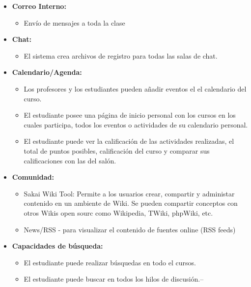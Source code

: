 	\begin{itemize}
		\item \textbf{Correo Interno:}
			\begin{itemize}
				\item Envío de mensajes a toda la clase
			\end{itemize}
	\end{itemize}
	\begin{itemize}
		\item \textbf{Chat:}	
			\begin{itemize}
				\item El sistema crea archivos de registro para todas las salas de chat.
			\end{itemize}
	\end{itemize}
	\begin{itemize}
		\item \textbf{Calendario/Agenda:}
			\begin{itemize}
				\item Los profesores y los estudiantes pueden añadir eventos el el calendario del curso.
				\item El estudiante posee una página de inicio personal con los cursos en los cuales participa, todos los eventos o actividades de su calendario personal.
				\item El estudiante puede ver la calificación de las actividades realizadas, el total de puntos posibles, calificación del curso y comparar sus calificaciones con las del salón.
			\end{itemize}
	\end{itemize}
	\begin{itemize}
		\item \textbf{Comunidad:}
			\begin{itemize}
				\item Sakai Wiki Tool: Permite a los usuarios  crear, compartir y administar contenido en un ambiente de Wiki. Se pueden compartir conceptos con otros Wikis open sourc como Wikipedia, TWiki, phpWiki, etc.
				\item News/RSS - para visualizar el contenido de fuentes online (RSS feeds)
		\end{itemize}
	\end{itemize}
	\begin{itemize}
		\item \textbf{Capacidades de búsqueda:}
			\begin{itemize}
				\item El estudiante puede realizar búsquedas en todo el cursos.
				\item El estudiante puede buscar en todos los hilos de discusión.--
			\end{itemize}
	\end{itemize}
